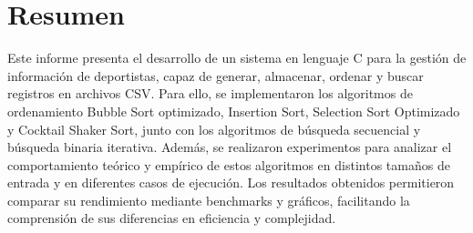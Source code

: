 \chapter*{Resumen}
Este informe presenta el desarrollo de un sistema en lenguaje C para la gestión de información de deportistas, capaz de generar, almacenar, ordenar y buscar registros en archivos CSV. Para ello, se implementaron los algoritmos de ordenamiento Bubble Sort optimizado, Insertion Sort, Selection Sort Optimizado y Cocktail Shaker Sort, junto con los algoritmos de búsqueda secuencial y búsqueda binaria iterativa. Además, se realizaron experimentos para analizar el comportamiento teórico y empírico de estos algoritmos en distintos tamaños de entrada y en diferentes casos de ejecución. Los resultados obtenidos permitieron comparar su rendimiento mediante benchmarks y gráficos, facilitando la comprensión de sus diferencias en eficiencia y complejidad.